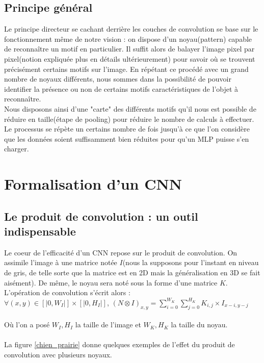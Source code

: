 \subsection{Principe général}
Le principe directeur se cachant derrière les couches de convolution se base sur le fonctionnement même de notre vision : on dispose d'un noyau(pattern) capable de reconnaître un motif en particulier. Il suffit alors de balayer l'image pixel par pixel(notion expliquée plus en détails ultérieurement) pour savoir où se trouvent précisément certains motifs sur l'image. En répétant ce procédé avec un grand nombre de noyaux différents, nous sommes dans la possibilité de pouvoir identifier la présence ou non de certains motifs caractéristiques de l'objet à reconnaître. \\
Nous disposons ainsi d'une "carte" des différents motifs qu'il nous est possible de réduire en taille(étape de pooling) pour réduire le nombre de calculs à effectuer. 
Le processus se répète un certains nombre de fois jusqu'à ce que l'on considère que les données soient suffisamment bien réduites pour qu'un MLP puisse s'en charger. 

\section{Formalisation d'un CNN}

\subsection{Le produit de convolution : un outil indispensable}

Le coeur de l'efficacité d'un CNN repose sur le produit de convolution. On assimile l'image à une matrice notée $I$(nous la supposons pour l'instant en niveau de gris, de telle sorte que la matrice est en 2D mais la généralisation en 3D se fait aisément). De même, le noyau sera noté sous la forme d'une matrice $K$.
L'opération de convolution s'écrit alors : \\

$\forall (x,y) \in [|0,W_I|] \times [|0,H_I|]$,  $(N \otimes I)_{x,y} = \sum_{i=0}^{W_K} \sum_{j=0}^{H_K} K_{i,j} \times I_{x-i,y-j}$ \\
\\
Où l'on a posé $W_I,H_I$ la taille de l'image et $W_K,H_K$ la taille du noyau. \\
\\
La figure \ref{chien_prairie} donne quelques exemples de l'effet du produit de convolution avec plusieurs noyaux.

